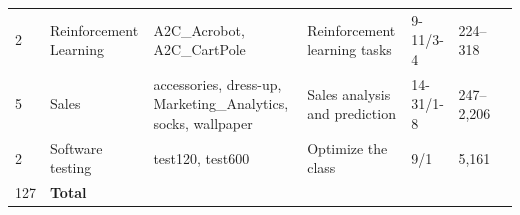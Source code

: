 \begin{table}[!t]
\begin{adjustbox}{max width=\textwidth}
\begin{tabular}{@{}C{1.4cm}@{~}p{2.5cm}p{3.9cm}p{4.0cm}p{1.1cm}p{1.4cm}c@{}}
 2           & Reinforcement Learning           & A2C\_Acrobot, A2C\_CartPole                                              & Reinforcement learning tasks                                          & 9-11/3-4   & 224–318  &     \\ 
5           & Sales                            & accessories, dress-up, Marketing\_Analytics, socks, wallpaper            & Sales analysis and prediction                                         & 14-31/1-8  & 247–2,206 &     \cite{jessicali9530_animal_crossing_new_horizons_nookplaza_dataset_2021, jackdaoud_marketing_data_2022, syedfaizanalii_car_price_dataset_cleaned_2025}  \\  
 2	& Software testing	& test120, test600	& Optimize the class	& 9/1	& 5,161 &\\ \midrule

127         & \textbf{Total}                            &                                                                          &                                                                       &              &        &      
\end{tabular}
\end{adjustbox}
\endgroup
\end{table}